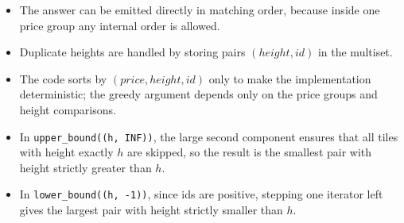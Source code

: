 \documentclass[11pt]{article}
\begin{document}
\begin{itemize}[leftmargin=*]
    \item The answer can be emitted directly in matching order, because inside one price group any internal order is allowed.
    \item Duplicate heights are handled by storing pairs $(height, id)$ in the multiset.
    \item The code sorts by $(price, height, id)$ only to make the implementation deterministic; the greedy argument depends only on the price groups and height comparisons.
    \item In \texttt{upper\_bound((h, INF))}, the large second component ensures that all tiles with height exactly $h$ are skipped, so the result is the smallest pair with height strictly greater than $h$.
    \item In \texttt{lower\_bound((h, -1))}, since ids are positive, stepping one iterator left gives the largest pair with height strictly smaller than $h$.
\end{itemize}
\end{document}
